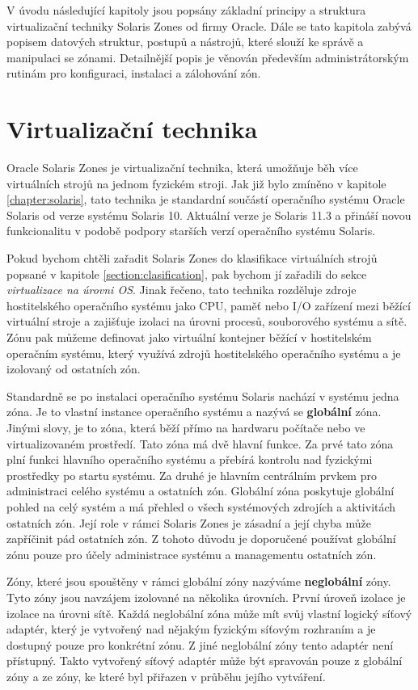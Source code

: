 V úvodu následující kapitoly jsou popsány základní principy a struktura virtualizační techniky Solaris Zones od
firmy Oracle. Dále se tato kapitola zabývá popisem datových struktur, postupů a nástrojů, které slouží ke správě a manipulaci
se zónami. Detailnější popis je věnován především administrátorským rutinám pro konfiguraci, instalaci a zálohování zón.
\section{Virtualizační technika}
Oracle Solaris Zones je virtualizační technika, která umožňuje běh více virtuálních strojů na jednom fyzickém stroji. Jak již
bylo zmíněno v kapitole \ref{chapter:solaris}, tato technika je standardní součástí operačního systému Oracle Solaris od 
verze systému Solaris 10. Aktuální verze je Solaris 11.3 a přináší novou funkcionalitu v podobě podpory starších verzí 
operačního systému Solaris.

Pokud bychom chtěli zařadit Solaris Zones do klasifikace virtuálních strojů popsané v kapitole \ref{section:clasification}, 
pak bychom jí zařadili do sekce \textit{virtualizace na úrovni OS}. Jinak řečeno, tato technika rozděluje zdroje hostitelského
operačního systému jako CPU, paměť nebo I/O zařízení mezi běžící virtuální stroje a zajišťuje izolaci na úrovni procesů,
souborového systému a sítě. Zónu pak můžeme definovat jako virtuální kontejner běžící v hostitelském operačním systému, který
využívá zdrojů hostitelského operačního systému a je izolovaný od ostatních zón.

Standardně se po instalaci operačního systému Solaris nachází v systému jedna zóna. Je to vlastní instance operačního systému
a nazývá se \textbf{globální} zóna. Jinými slovy, je to zóna, která běží přímo na hardwaru počítače nebo ve virtualizovaném
prostředí. Tato zóna má dvě hlavní funkce. Za prvé tato zóna plní funkci hlavního operačního systému a přebírá kontrolu
nad fyzickými prostředky po startu systému. Za druhé je hlavním centrálním prvkem pro administraci celého systému a ostatních
zón. Globální zóna poskytuje globální pohled na celý systém a má přehled o všech systémových zdrojích a aktivitách ostatních
zón. Její role v rámci Solaris Zones je zásadní a její chyba může zapříčinit pád ostatních zón. Z tohoto důvodu je doporučené
používat globální zónu pouze pro účely administrace systému a managementu ostatních zón.

Zóny, které jsou spouštěny v rámci globální zóny nazýváme \textbf{neglobální} zóny. Tyto zóny jsou navzájem izolované na
několika úrovních. První úroveň izolace je izolace na úrovni sítě. Každá neglobální zóna může mít svůj vlastní logický síťový
adaptér, který je vytvořený nad nějakým fyzickým síťovým rozhraním a je dostupný pouze pro konkrétní zónu. Z jiné neglobální
zóny tento adaptér není přístupný. Takto vytvořený síťový adaptér může být spravován pouze z globální zóny a ze zóny, ke které
byl přiřazen v průběhu jejího vytváření.

